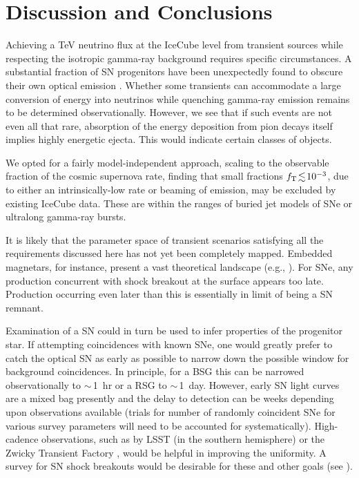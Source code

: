 \documentclass[aps,prd,nofootinbib,twocolumn,floatfix,letterpaper,superscriptaddress,showpacs]{revtex4}
\begin{document}
\section{Discussion and Conclusions}
\label{concl}
%
Achieving a TeV neutrino flux at the IceCube level from transient sources while respecting the isotropic gamma-ray background requires specific circumstances.
A substantial fraction of SN progenitors have been unexpectedly found to obscure their own optical emission \cite{Prieto:2008bw,Thompson:2008sv}.
Whether some transients can accommodate a large conversion of energy into neutrinos while quenching gamma-ray emission remains to be determined observationally.  However, we see that if such events are not even all that rare, absorption of the energy deposition from pion decays itself implies highly energetic ejecta.  This would indicate certain classes of objects.

We opted for a fairly model-independent approach, scaling to the observable fraction of the cosmic supernova rate, finding that small fractions $f_{\rm T} \!\lesssim\! 10^{-3}$, due to either an intrinsically-low rate or beaming of emission, may be excluded by existing IceCube data.  These are within the ranges of buried jet models of SNe or ultralong gamma-ray bursts.

It is likely that the parameter space of transient scenarios satisfying all the requirements discussed here has not yet been completely mapped.
Embedded magnetars, for instance, present a vast theoretical landscape (e.g., \cite{Metzger:2015tra,Kashiyama:2015eua}).
For SNe, any production concurrent with shock breakout at the surface appears too late.  Production occurring even later than this is essentially in limit of being a SN remnant.


Examination of a SN could in turn be used to infer properties of the progenitor star.
If attempting coincidences with known SNe, one would greatly prefer to catch the optical SN as early as possible to narrow down the possible window for background coincidences.
In principle, for a BSG this can be narrowed observationally to $\sim\,$1~hr or a RSG to $\sim\,$1~day.
However, early SN light curves are a mixed bag presently and the delay to detection can be weeks depending upon observations available (trials for number of randomly coincident SNe for various survey parameters will need to be accounted for systematically).
High-cadence observations, such as by LSST \cite{Abell:2009aa} (in the southern hemisphere) or the Zwicky Transient Factory \cite{Bellm:2014pia}, would be helpful in improving the uniformity.
A survey for SN shock breakouts would be desirable for these and other goals (see \cite{Kistler2013}).
\end{document}
